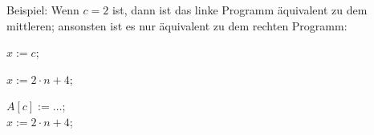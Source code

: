 Beispiel: Wenn $c=2$ ist, dann ist das linke Programm  äquivalent zu dem
mittleren; ansonsten ist es nur äquivalent zu dem rechten Programm:\\

\begin{minipage}[c]{4cm}
\begin{algorithm}[H]
    \( x := c \);\\
\end{algorithm}
\end{minipage}
\begin{minipage}[c]{4cm}
\begin{algorithm}[H]
    \( x := 2 \cdot n + 4 \);
\end{algorithm}
\end{minipage}
\begin{minipage}[c]{4cm}
    \begin{algorithm}[H]
        \( A[c] := \dots \);\\
        \( x := 2 \cdot n + 4 \);
    \end{algorithm}
\end{minipage}


